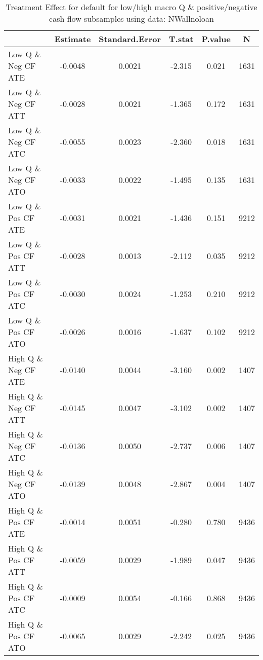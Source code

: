 \begin{table}[ht]
\centering
\caption{Treatment Effect for default for low/high macro Q & positive/negative cash flow subsamples using data: NWallnoloan} 
\label{tab:q_cf_TE}
\begingroup\footnotesize
\begin{tabular}{lccccc}
  \hline
 & Estimate & Standard.Error & T.stat & P.value & N \\ 
  \hline
Low Q \& Neg CF ATE & -0.0048 & 0.0021 & -2.315 & 0.021 & 1631 \\ 
  Low Q \& Neg CF ATT & -0.0028 & 0.0021 & -1.365 & 0.172 & 1631 \\ 
  Low Q \& Neg CF ATC & -0.0055 & 0.0023 & -2.360 & 0.018 & 1631 \\ 
  Low Q \& Neg CF ATO & -0.0033 & 0.0022 & -1.495 & 0.135 & 1631 \\ 
  Low Q \& Pos CF ATE & -0.0031 & 0.0021 & -1.436 & 0.151 & 9212 \\ 
  Low Q \& Pos CF ATT & -0.0028 & 0.0013 & -2.112 & 0.035 & 9212 \\ 
  Low Q \& Pos CF ATC & -0.0030 & 0.0024 & -1.253 & 0.210 & 9212 \\ 
  Low Q \& Pos CF ATO & -0.0026 & 0.0016 & -1.637 & 0.102 & 9212 \\ 
  High Q \& Neg CF ATE & -0.0140 & 0.0044 & -3.160 & 0.002 & 1407 \\ 
  High Q \& Neg CF ATT & -0.0145 & 0.0047 & -3.102 & 0.002 & 1407 \\ 
  High Q \& Neg CF ATC & -0.0136 & 0.0050 & -2.737 & 0.006 & 1407 \\ 
  High Q \& Neg CF ATO & -0.0139 & 0.0048 & -2.867 & 0.004 & 1407 \\ 
  High Q \& Pos CF ATE & -0.0014 & 0.0051 & -0.280 & 0.780 & 9436 \\ 
  High Q \& Pos CF ATT & -0.0059 & 0.0029 & -1.989 & 0.047 & 9436 \\ 
  High Q \& Pos CF ATC & -0.0009 & 0.0054 & -0.166 & 0.868 & 9436 \\ 
  High Q \& Pos CF ATO & -0.0065 & 0.0029 & -2.242 & 0.025 & 9436 \\ 
   \hline
\end{tabular}
\endgroup
\end{table}
